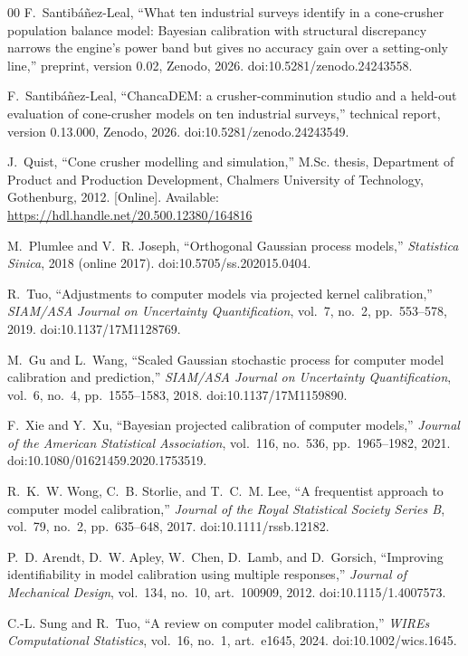 \begin{thebibliography}{00}
 F.~Santib\'a\~nez-Leal, ``What ten industrial surveys identify in a cone-crusher population balance model:
Bayesian calibration with structural discrepancy narrows the engine's power band but gives no accuracy gain over a
setting-only line,'' preprint, version 0.02, Zenodo, 2026. doi:10.5281/zenodo.24243558.

 F.~Santib\'a\~nez-Leal, ``ChancaDEM: a crusher-comminution studio and a held-out evaluation of
cone-crusher models on ten industrial surveys,'' technical report, version 0.13.000, Zenodo, 2026.
doi:10.5281/zenodo.24243549.

 J.~Quist, ``Cone crusher modelling and simulation,'' M.Sc. thesis, Department of Product and
Production Development, Chalmers University of Technology, Gothenburg, 2012. [Online]. Available:
\url{https://hdl.handle.net/20.500.12380/164816}

 M.~Plumlee and V.~R. Joseph, ``Orthogonal Gaussian process models,'' \emph{Statistica Sinica},
2018 (online 2017). doi:10.5705/ss.202015.0404.

 R.~Tuo, ``Adjustments to computer models via projected kernel calibration,'' \emph{SIAM/ASA Journal on
Uncertainty Quantification}, vol.~7, no.~2, pp.~553--578, 2019. doi:10.1137/17M1128769.

 M.~Gu and L.~Wang, ``Scaled Gaussian stochastic process for computer model calibration and prediction,''
\emph{SIAM/ASA Journal on Uncertainty Quantification}, vol.~6, no.~4, pp.~1555--1583, 2018. doi:10.1137/17M1159890.

 F.~Xie and Y.~Xu, ``Bayesian projected calibration of computer models,'' \emph{Journal of the American
Statistical Association}, vol.~116, no.~536, pp.~1965--1982, 2021. doi:10.1080/01621459.2020.1753519.

 R.~K.~W. Wong, C.~B. Storlie, and T.~C.~M. Lee, ``A frequentist approach to computer model calibration,''
\emph{Journal of the Royal Statistical Society Series B}, vol.~79, no.~2, pp.~635--648, 2017. doi:10.1111/rssb.12182.

 P.~D. Arendt, D.~W. Apley, W.~Chen, D.~Lamb, and D.~Gorsich, ``Improving identifiability in model
calibration using multiple responses,'' \emph{Journal of Mechanical Design}, vol.~134, no.~10, art.~100909, 2012.
doi:10.1115/1.4007573.

 C.-L. Sung and R.~Tuo, ``A review on computer model calibration,'' \emph{WIREs Computational Statistics},
vol.~16, no.~1, art.~e1645, 2024. doi:10.1002/wics.1645.


\end{thebibliography}
